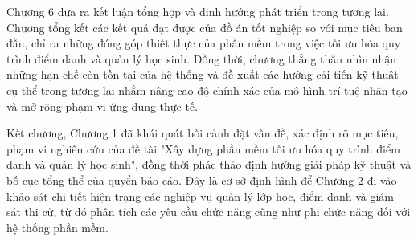 \documentclass[../DoAn.tex]{subfiles}
\begin{document}
Chương 6 đưa ra kết luận tổng hợp và định hướng phát triển trong tương lai. Chương tổng kết các kết quả đạt được của đồ án tốt nghiệp so với mục tiêu ban đầu, chỉ ra những đóng góp thiết thực của phần mềm trong việc tối ưu hóa quy trình điểm danh và quản lý học sinh. Đồng thời, chương thẳng thắn nhìn nhận những hạn chế còn tồn tại của hệ thống và đề xuất các hướng cải tiến kỹ thuật cụ thể trong tương lai nhằm nâng cao độ chính xác của mô hình trí tuệ nhân tạo và mở rộng phạm vi ứng dụng thực tế.

Kết chương, Chương 1 đã khái quát bối cảnh đặt vấn đề, xác định rõ mục tiêu, phạm vi nghiên cứu của đề tài "Xây dựng phần mềm tối ưu hóa quy trình điểm danh và quản lý học sinh", đồng thời phác thảo định hướng giải pháp kỹ thuật và bố cục tổng thể của quyển báo cáo. Đây là cơ sở định hình để Chương 2 đi vào khảo sát chi tiết hiện trạng các nghiệp vụ quản lý lớp học, điểm danh và giám sát thi cử, từ đó phân tích các yêu cầu chức năng cũng như phi chức năng đối với hệ thống phần mềm.
\end{document}
